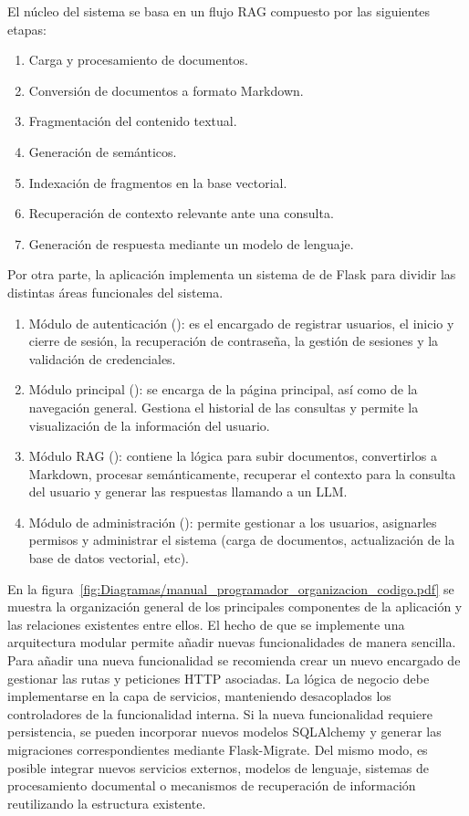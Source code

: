 El núcleo del sistema se basa en un flujo RAG compuesto por las siguientes etapas:
\begin{enumerate}
\tightlist
	\item Carga y procesamiento de documentos.
	\item Conversión de documentos a formato Markdown.
	\item Fragmentación del contenido textual.
	\item Generación de  semánticos.
	\item Indexación de fragmentos en la base vectorial.
	\item Recuperación de contexto relevante ante una consulta.
	\item Generación de respuesta mediante un modelo de lenguaje.
\end{enumerate}

Por otra parte, la aplicación implementa un sistema de  de Flask para dividir las distintas áreas funcionales del sistema.

\begin{enumerate}
\tightlist
	 \item Módulo de autenticación (): es el encargado de registrar usuarios, el inicio y cierre de sesión, la recuperación de contraseña, la gestión de sesiones y la validación de credenciales.
	 \item Módulo principal (): se encarga de la página principal, así como de la navegación general. Gestiona el historial de las consultas y permite la visualización de la información del usuario.
	 \item Módulo RAG (): contiene la lógica para subir documentos, convertirlos a Markdown, procesar semánticamente, recuperar el contexto para la consulta del usuario y generar las respuestas llamando a un LLM.
	 \item Módulo de administración (): permite gestionar a los usuarios, asignarles permisos y administrar el sistema (carga de documentos, actualización de la base de datos vectorial, etc).
\end{enumerate}

En la figura~\ref{fig:Diagramas/manual_programador_organizacion_codigo.pdf} se muestra la organización general de los principales componentes  de la aplicación y las relaciones existentes entre ellos. El hecho de que se implemente una arquitectura modular permite añadir nuevas funcionalidades de manera sencilla. Para añadir una nueva funcionalidad se recomienda crear un nuevo  encargado de gestionar las rutas y peticiones HTTP asociadas. La lógica de negocio debe implementarse en la capa de servicios, manteniendo desacoplados los controladores de la funcionalidad interna. Si la nueva funcionalidad requiere persistencia, se pueden incorporar nuevos modelos SQLAlchemy y generar las migraciones correspondientes mediante Flask-Migrate. Del mismo modo, es posible integrar nuevos servicios externos, modelos de lenguaje, sistemas de procesamiento documental o mecanismos de recuperación de información reutilizando la estructura existente.

